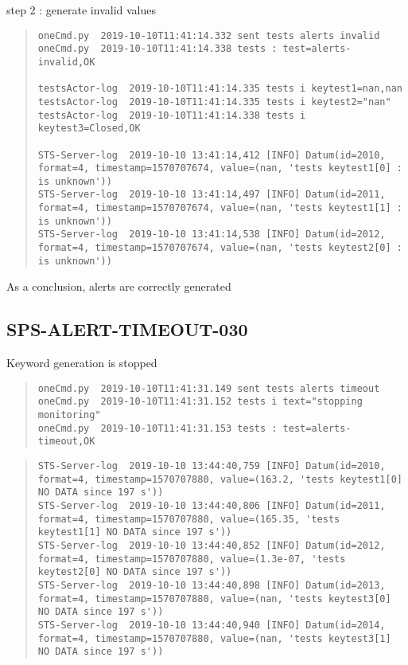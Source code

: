 \noindent step 2 : generate invalid values

\begin{quote}
\begin{tiny}
\begin{verbatim}
oneCmd.py  2019-10-10T11:41:14.332 sent tests alerts invalid
oneCmd.py  2019-10-10T11:41:14.338 tests : test=alerts-invalid,OK

testsActor-log  2019-10-10T11:41:14.335 tests i keytest1=nan,nan
testsActor-log  2019-10-10T11:41:14.335 tests i keytest2="nan"
testsActor-log  2019-10-10T11:41:14.338 tests i keytest3=Closed,OK

STS-Server-log  2019-10-10 13:41:14,412 [INFO] Datum(id=2010, format=4, timestamp=1570707674, value=(nan, 'tests keytest1[0] : is unknown'))
STS-Server-log  2019-10-10 13:41:14,497 [INFO] Datum(id=2011, format=4, timestamp=1570707674, value=(nan, 'tests keytest1[1] : is unknown'))
STS-Server-log  2019-10-10 13:41:14,538 [INFO] Datum(id=2012, format=4, timestamp=1570707674, value=(nan, 'tests keytest2[0] : is unknown'))
\end{verbatim}
\end{tiny}
\end{quote}

\noindent As a conclusion, alerts are correctly generated

\subsection{SPS-ALERT-TIMEOUT-030}
\label{sec:tc-030}

Keyword generation is stopped
\begin{quote}
\begin{tiny}
\begin{verbatim}
oneCmd.py  2019-10-10T11:41:31.149 sent tests alerts timeout
oneCmd.py  2019-10-10T11:41:31.152 tests i text="stopping monitoring"
oneCmd.py  2019-10-10T11:41:31.153 tests : test=alerts-timeout,OK
\end{verbatim}
\end{tiny}
\end{quote}

\begin{quote}
\begin{tiny}
\begin{verbatim}
STS-Server-log  2019-10-10 13:44:40,759 [INFO] Datum(id=2010, format=4, timestamp=1570707880, value=(163.2, 'tests keytest1[0] NO DATA since 197 s'))
STS-Server-log  2019-10-10 13:44:40,806 [INFO] Datum(id=2011, format=4, timestamp=1570707880, value=(165.35, 'tests keytest1[1] NO DATA since 197 s'))
STS-Server-log  2019-10-10 13:44:40,852 [INFO] Datum(id=2012, format=4, timestamp=1570707880, value=(1.3e-07, 'tests keytest2[0] NO DATA since 197 s'))
STS-Server-log  2019-10-10 13:44:40,898 [INFO] Datum(id=2013, format=4, timestamp=1570707880, value=(nan, 'tests keytest3[0] NO DATA since 197 s'))
STS-Server-log  2019-10-10 13:44:40,940 [INFO] Datum(id=2014, format=4, timestamp=1570707880, value=(nan, 'tests keytest3[1] NO DATA since 197 s'))
\end{verbatim}
\end{tiny}
\end{quote}

